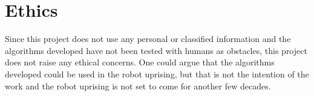 


\chapter{Ethics}

\label{chapter:ethics}

Since this project does not use any personal or classified information and the
algorithms developed have not been tested with humans as obstacles, this
project does not raise any ethical concerns. One could argue that the
algorithms developed could be used in the robot uprising, but that is not the
intention of the work and the robot uprising is not set to come for another few
decades. %

% 
% 
% 
% 
% 



